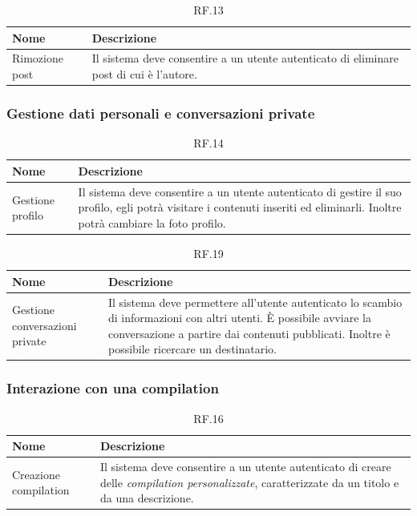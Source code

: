 \documentclass{natourDoc}
\begin{document}
	\begin{table}[H]
		\centering
		\begin{tabular}{ |p{5cm}|p{10.3cm}| }
			\hline
			\rowcolor{PineGreen!70}
			\textbf{Nome} & \textbf{Descrizione} \\
			\hline
			Rimozione post & Il sistema deve consentire a un utente autenticato di eliminare post di cui
			è l'autore. \\
			\hline
		\end{tabular}
		\caption{RF.13}
		\label{table:13}
	\end{table}
	
	\subsubsection{Gestione dati personali e conversazioni private}
	\begin{table}[H]
		\centering
		\begin{tabular}{ |p{5cm}|p{10.3cm}| } 
			\hline
			\rowcolor{PineGreen!70}
			\textbf{Nome} & \textbf{Descrizione} \\
			\hline
			Gestione profilo &  Il sistema deve consentire a un utente autenticato di gestire il suo profilo, 
			egli potrà visitare i contenuti inseriti ed eliminarli. Inoltre potrà cambiare la foto profilo. \\
			\hline
		\end{tabular}
		\caption{RF.14}
		\label{table:14}
	\end{table}

	\begin{table}[H]
		\centering
		\begin{tabular}{ |p{5cm}|p{10.3cm}| }
			\hline
			\rowcolor{PineGreen!70}
			\textbf{Nome} & \textbf{Descrizione} \\
			\hline
			Gestione conversazioni private & Il sistema deve permettere all'utente autenticato lo scambio di informazioni con altri utenti.
			È possibile avviare la conversazione a partire dai contenuti pubblicati. Inoltre è possibile ricercare un destinatario. \\
			\hline
		\end{tabular}
		\caption{RF.19}
		\label{table:19}
	\end{table}
	
	\subsubsection{Interazione con una compilation}
	\begin{table}[H]
		\centering
		\begin{tabular}{ |p{5cm}|p{10.3cm}| }
			\hline
			\rowcolor{PineGreen!70}
			\textbf{Nome} & \textbf{Descrizione} \\
			\hline
			Creazione compilation & Il sistema deve consentire a un utente autenticato di creare delle \textit{compilation personalizzate},
			caratterizzate da un titolo e da una descrizione. \\
			\hline
		\end{tabular}
		\caption{RF.16}
		\label{table:16}
	\end{table}
\end{document}
